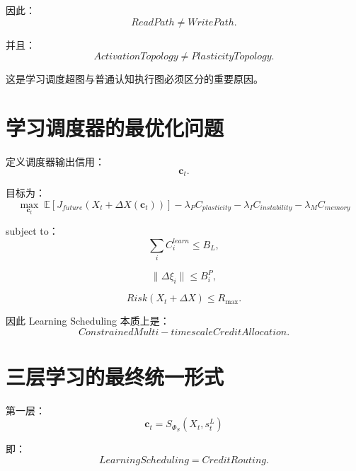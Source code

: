 因此：
\begin{equation}
\boxed{
ReadPath
\neq
WritePath.
}
\end{equation}

并且：
\begin{equation}
\boxed{
ActivationTopology
\neq
PlasticityTopology.
}
\end{equation}

这是学习调度超图与普通认知执行图必须区分的重要原因。


\section{学习调度器的最优化问题}

定义调度器输出信用：
\begin{equation}
\mathbf{c}_t.
\end{equation}

目标为：
\begin{equation}
\boxed{
\max_{\mathbf{c}_t}
\;
\mathbb{E}
\left[
J_{future}
(
X_t+\Delta X(\mathbf{c}_t)
)
\right]
-
\lambda_P
C_{plasticity}
-
\lambda_I
C_{instability}
-
\lambda_M
C_{memory}
}
\end{equation}

subject to：
\begin{equation}
\sum_i
C_i^{learn}
\leq
B_L,
\end{equation}

\begin{equation}
\|\Delta\xi_i\|
\leq
B_i^P,
\end{equation}

\begin{equation}
Risk(X_t+\Delta X)
\leq
R_{\max}.
\end{equation}

因此 Learning Scheduling 本质上是：
\begin{equation}
\boxed{
ConstrainedMulti-timescaleCreditAllocation.
}
\end{equation}


\section{三层学习的最终统一形式}

第一层：
\begin{equation}
\boxed{
\mathbf{c}_t
=
S_{\Phi_S}
(
X_t,
s_t^L
)
}
\end{equation}

即：
\begin{equation}
LearningScheduling
=
CreditRouting.
\end{equation}

